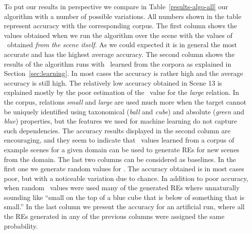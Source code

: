 To put our results in perspective we compare in Table~\ref{results-algo-all} 
our algorithm with a number of possible variations.  All numbers shown in the table 
represent accuracy with the corresponding corpus. 
The first column shows the values obtained when we run the algorithm over the scene
with the values of \puse\ obtained \emph{from the scene itself}.  As we could expected
it is in general the most accurate and has the highest average accuracy. 
%
The second column shows the results of the algorithm runs with \puse\ learned from the 
corpora as explained in Section~\ref{sec:learning}.  In most cases the accuracy 
is rather high and the average accuracy is still high. The relatively low accuracy 
obtained in Scene 13 is explained mostly by the poor estimation of the \puse\ value for the \emph{large} 
relation. In the corpus, relations \emph{small} and \emph{large} are used much more when the target cannot be uniquely identified using taxonomical (\emph{ball} and \emph{cube}) and absolute (\emph{green} and \emph{blue}) properties, but the features we used for machine learning do not capture such dependencies. 
%
The accuracy results displayed in the second column are 
encouraging, and they seem to indicate that \puse\ values learned from a corpus of example 
scenes for a given domain can be used to generate REs for new scenes from the domain. 
%
The last two columns can be considered as baselines. In the first one we generate 
random values for \puse.  The accuracy obtained is in most cases poor, but with 
a noticeable variation due to chance. 
In addition to poor accuracy, when random \puse\ values were used many of the generated REs where unnaturally sounding like ``small 
on the top of a blue cube that is below of something that is small.'' In the last column we present the accuracy for an artificial run, where all the 
REs generated in any of the previous columns were assigned the same 
probability. 

